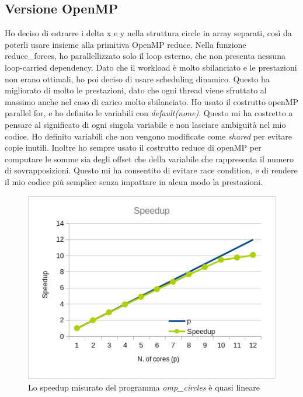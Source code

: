 \documentclass[a4paper,11pt, twoside]{report}
\begin{document}
\subsection*{Versione OpenMP}
Ho deciso di estrarre i delta x e y nella struttura circle in array separati, così da poterli usare insieme alla primitiva OpenMP reduce.
Nella funzione reduce\_forces, ho parallellizzato solo il loop esterno, che non presenta nessuna loop-carried dependency.
Dato che il workload è molto sbilanciato e le prestazioni non erano ottimali, ho poi deciso di usare scheduling dinamico.
Questo ha migliorato di molto le prestazioni, dato che ogni thread viene sfruttato al massimo anche nel caso di carico molto sbilanciato.
Ho usato il costrutto openMP parallel for, e ho definito le variabili con \textit{default(none)}.
Questo mi ha costretto a pensare al significato di ogni singola variabile e non lasciare ambiguità nel mio codice.
Ho definito variabili che non vengono modificate come \textit{shared} per evitare copie inutili.
Inoltre ho sempre usato il costrutto reduce di openMP per computare le somme sia degli offset che della variabile che rappresenta il numero di sovrapposizioni.
Questo mi ha consentito di evitare race condition, e di rendere il mio codice più semplice senza impattare in alcun modo la prestazioni.
\begin{figure}[H]
    \includegraphics[scale=0.5]{images/omp_speedup.png}
    \caption[]{Lo speedup misurato del programma \textit{omp\_circles} è quasi lineare}
\end{figure}
\end{document}
